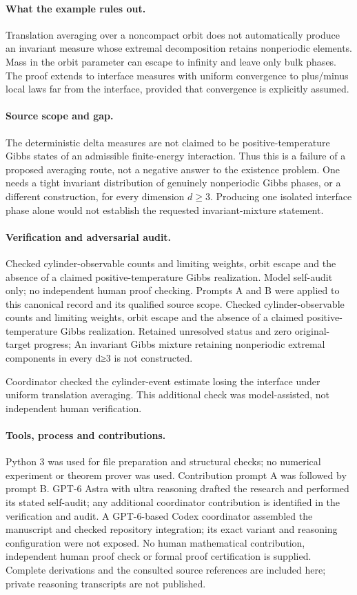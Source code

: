 \documentclass[11pt]{article}
\begin{document}
\paragraph{What the example rules out.} Translation averaging over a noncompact orbit does not automatically produce an invariant measure whose extremal decomposition retains nonperiodic elements. Mass in the orbit parameter can escape to infinity and leave only bulk phases. The proof extends to interface measures with uniform convergence to plus/minus local laws far from the interface, provided that convergence is explicitly assumed.

\paragraph{Source scope and gap.} The deterministic delta measures are not claimed to be positive-temperature Gibbs states of an admissible finite-energy interaction. Thus this is a failure of a proposed averaging route, not a negative answer to the existence problem. One needs a tight invariant distribution of genuinely nonperiodic Gibbs phases, or a different construction, for every dimension $d\geq3$. Producing one isolated interface phase alone would not establish the requested invariant-mixture statement.

\paragraph{Verification and adversarial audit.}
Checked cylinder-observable counts and limiting weights, orbit escape and the absence of a claimed positive-temperature Gibbs realization. Model self-audit only; no independent human proof checking. Prompts A and B were applied to this canonical record and its qualified source scope. Checked cylinder-observable counts and limiting weights, orbit escape and the absence of a claimed positive-temperature Gibbs realization. Retained unresolved status and zero original-target progress; An invariant Gibbs mixture retaining nonperiodic extremal components in every d≥3 is not constructed.

Coordinator checked the cylinder-event estimate losing the interface under uniform translation averaging. This additional check was model-assisted, not independent human verification.

\paragraph{Tools, process and contributions.}
Python 3 was used for file preparation and structural checks; no numerical experiment or theorem prover was used. Contribution prompt A was followed by prompt B. GPT-6 Astra with ultra reasoning drafted the research and performed its stated self-audit; any additional coordinator contribution is identified in the verification and audit. A GPT-6-based Codex coordinator assembled the manuscript and checked repository integration; its exact variant and reasoning configuration were not exposed. No human mathematical contribution, independent human proof check or formal proof certification is supplied. Complete derivations and the consulted source references are included here; private reasoning transcripts are not published.
\end{document}
